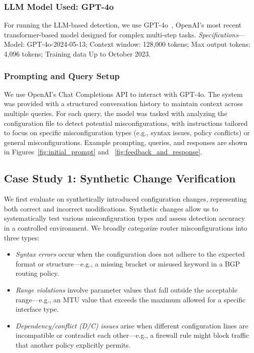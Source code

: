 \subsubsection{LLM Model Used: GPT-4o} For running the LLM-based detection, we use GPT-4o~\cite{openai_gpt4o}, OpenAI's most recent transformer-based model designed for complex multi-step tasks.
\textit{Specifications}---Model: GPT-4o-2024-05-13; Context window: 128,000 tokens; Max output tokens: 4,096 tokens; Training data Up to October 2023.

\subsubsection{Prompting and Query Setup}
We use OpenAI’s Chat Completions API to interact with GPT-4o. The system was provided with a structured conversation history to maintain context across multiple queries. For each query, the model was tasked with analyzing the configuration file to detect potential misconfigurations, with instructions tailored to focus on specific misconfiguration types (e.g., syntax issues, policy conflicts) or general misconfigurations. Example prompting, queries, and responses are shown in Figures~\ref{fig:initial_prompt} and ~\ref{fig:feedback_and_response}.

\subsection{Case Study 1: Synthetic Change Verification}
We first evaluate \sysname{} on synthetically introduced configuration changes, representing both correct and incorrect modifications. Synthetic changes allow us to systematically test various misconfiguration types and assess detection accuracy in a controlled environment.
We broadly categorize router misconfigurations into three types:
\begin{itemize}
    \item \textit{Syntax errors} occur when the configuration does not adhere to the expected format or structure---e.g., a missing bracket or misused keyword in a BGP routing policy.
    \item \textit{Range violations} involve parameter values that fall outside the acceptable range---e.g., an MTU value that exceeds the maximum allowed for a specific interface type.
    \item \textit{Dependency/conflict (D/C) issues} arise when different configuration lines are incompatible or contradict each other---e.g., a firewall rule might block traffic that another policy explicitly permits.
\end{itemize}


